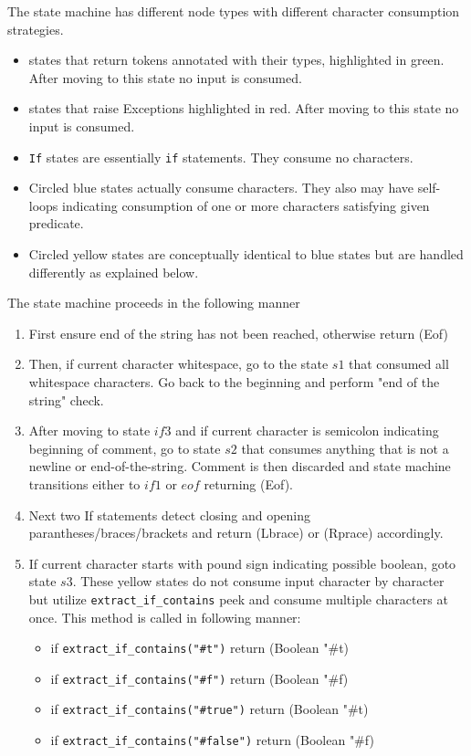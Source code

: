 \begin{itemize}
The state machine has different node types with different character consumption strategies.
\begin{itemize}
\item states that return tokens annotated with their types, highlighted in green. After moving to this state no input is consumed.
\item states that raise Exceptions highlighted in red. After moving to this state no input is consumed.
\item \texttt{If} states are essentially \texttt{if} statements. They consume no characters.
\item Circled blue states actually consume characters. They also may have self-loops indicating consumption of one or more characters satisfying given predicate.
\item Circled yellow states are conceptually identical to blue states but are handled differently as explained below.
\end{itemize}

The state machine proceeds in the following manner

\begin{enumerate}
\item First ensure end of the string has not been reached, otherwise return (Eof)
\item Then, if current character whitespace, go to the state $s1$ that consumed all whitespace characters. Go back to the beginning and perform "end of the string" check.
\item After moving to state $if3$ and if current character is semicolon indicating beginning of comment, go to state $s2$ that consumes anything that is not a newline or end-of-the-string. Comment is then discarded and state machine transitions either to $if1$ or $eof$ returning (Eof).
\item Next two If statements detect closing and opening parantheses/braces/brackets and return (Lbrace) or (Rprace) accordingly.
\item If current character starts with pound sign indicating possible boolean, goto state $s3$. These yellow states do not consume input character by character but utilize \texttt{extract\_if\_contains} peek and consume multiple characters at once. This method is called in following manner:
\begin{itemize}
\item
if \texttt{extract\_if\_contains("\#t")} return (Boolean "\#t)
\item
if \texttt{extract\_if\_contains("\#f")} return (Boolean "\#f)
\item
if \texttt{extract\_if\_contains("\#true")} return (Boolean "\#t)
\item
if \texttt{extract\_if\_contains("\#false")} return (Boolean "\#f)
\end{itemize}


\end{enumerate}
\end{itemize}
